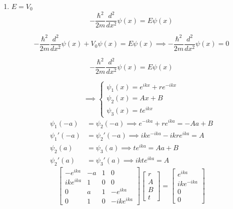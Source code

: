\documentclass[lang=cn,10pt]{elegantbook}
\begin{document}
\begin{enumerate}
	\[
	T = |t|^2 = \left| \frac{\det M_4}{\det M_0} \right|^2 = \frac{1}{1 + \frac{(k^2+l^2)^2}{4k^2l^2}\sinh^2(2la)}
	\]
	
	\[
	= \frac{1}{1 + \frac{V_0^2}{4E(V_0 - E)} \sinh^2 \left( \frac{2a}{\hbar} \sqrt{2\mu(V_0 - E)} \right)}
	\]
	
	\[
	R = 1 - T
	\]
	
	我们发现，在 \( E < V_0 \) 时粒子仍有一定概率穿透势垒。
	
	我们称这种现象为量子隧穿（Quantum tunneling）。
	
	其物理机制可能与QFT有关。
	
	量子隧穿与很多日常现象有关。
	
	\item $E = V_0$
	\begin{equation*}
		-\frac{\hbar^2}{2m} \frac{d^2}{dx^2} \psi(x) = E \psi(x)
	\end{equation*}
	
	\begin{equation*}
		-\frac{\hbar^2}{2m} \frac{d^2}{dx^2} \psi(x) + V_0 \psi(x) = E \psi(x) \implies -\frac{\hbar^2}{2m} \frac{d^2}{dx^2} \psi(x) = 0
	\end{equation*}
	
	\begin{equation*}
		-\frac{\hbar^2}{2m} \frac{d^2}{dx^2} \psi(x) = E \psi(x)
	\end{equation*}
	
	\begin{equation*}
		\implies
		\begin{cases}
			\psi_1(x) = e^{ikx} + re^{-ikx} \\
			\psi_2(x) = Ax + B \\
			\psi_3(x) = te^{ikx}
		\end{cases}
	\end{equation*}
	\begin{align*}
			\psi_1(-a) &= \psi_2(-a) \implies e^{-ika} + re^{ika} = -Aa + B \\
			\psi_1'(-a) &= \psi_2'(-a) \implies ike^{-ika} - ikre^{ika} = A \\
			\psi_2(a) &= \psi_3(a) \implies te^{ika} = Aa + B \\
			\psi_2'(a) &= \psi_3'(a) \implies ikte^{ika} = A
	\end{align*}
	\[
	\begin{bmatrix}
		-e^{ika} & -a & 1 & 0 \\
		ike^{ika} & 1 & 0 & 0 \\
		0 & a & 1 & -e^{ika} \\
		0 & 1 & 0 & -ike^{ika}
	\end{bmatrix}
	\begin{bmatrix}
		r \\
		A \\
		B \\
		t
	\end{bmatrix}
	=
	\begin{bmatrix}
		e^{ika} \\
		ike^{-ika} \\
		0 \\
		0
	\end{bmatrix}
	\]
	

\end{enumerate}
\end{document}
